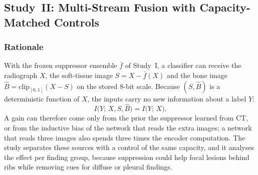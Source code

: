 \subsection{Study~II: Multi-Stream Fusion with Capacity-Matched Controls}
\label{sec:m-study2}

\subsubsection{Rationale}
With the frozen suppressor ensemble $\bar f$ of Study~I, a classifier can receive the radiograph $X$, the soft-tissue image
$S=X-\bar f(X)$ and the bone image $\hat B=\mathrm{clip}_{[0,1]}(X-S)$ on the stored 8-bit scale. Because $(S,\hat B)$ is a deterministic
function of $X$, the inputs carry no new information about a label $Y$:
\begin{equation}
I\big(Y;\,X,S,\hat B\big)=I\big(Y;\,X\big).
\label{eq:info}
\end{equation}
A gain can therefore come only from the prior the suppressor learned from CT, or from the inductive bias of the network that reads the
extra images; a network that reads three images also spends three times the encoder computation. The study separates these sources with a
control of the same capacity, and it analyses the effect per finding group, because suppression could help focal lesions behind ribs while
removing cues for diffuse or pleural findings.

